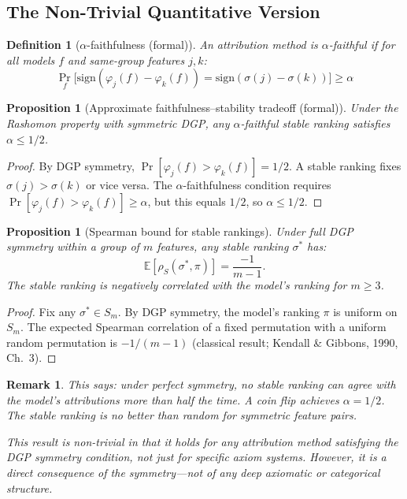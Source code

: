 \documentclass{article}
\newtheorem{definition}[theorem]{Definition}
\newtheorem{proposition}[theorem]{Proposition}
\newtheorem{remark}[theorem]{Remark}
\newcommand{\E}{\mathbb{E}}
\begin{document}
\subsection{The Non-Trivial Quantitative Version}

\begin{definition}[$\alpha$-faithfulness (formal)]
An attribution method is $\alpha$-faithful if for all models $f$ and same-group features $j, k$:
\[
    \Pr_f\!\big[\text{sign}(\varphi_j(f) - \varphi_k(f)) = \text{sign}(\sigma(j) - \sigma(k))\big] \geq \alpha
\]
\end{definition}

\begin{proposition}[Approximate faithfulness--stability tradeoff (formal)]
\label{prop:approx-tradeoff}
Under the Rashomon property with symmetric DGP, any $\alpha$-faithful stable ranking satisfies $\alpha \leq 1/2$.
\end{proposition}

\begin{proof}
By DGP symmetry, $\Pr[\varphi_j(f) > \varphi_k(f)] = 1/2$. A stable ranking fixes $\sigma(j) > \sigma(k)$ or vice versa. The $\alpha$-faithfulness condition requires $\Pr[\varphi_j(f) > \varphi_k(f)] \geq \alpha$, but this equals $1/2$, so $\alpha \leq 1/2$.
\end{proof}

\begin{proposition}[Spearman bound for stable rankings]
\label{prop:spearman-stable}
Under full DGP symmetry within a group of $m$ features, any stable ranking $\sigma^*$ has:
\[
    \E[\rho_S(\sigma^*, \pi)] = \frac{-1}{m - 1}.
\]
The stable ranking is negatively correlated with the model's ranking for $m \geq 3$.
\end{proposition}

\begin{proof}
Fix any $\sigma^* \in S_m$. By DGP symmetry, the model's ranking $\pi$ is uniform on $S_m$. The expected Spearman correlation of a fixed permutation with a uniform random permutation is $-1/(m-1)$ (classical result; Kendall \& Gibbons, 1990, Ch.~3).
\end{proof}

\begin{remark}
This says: under perfect symmetry, no stable ranking can agree
with the model's attributions more than half the time. A coin
flip achieves $\alpha = 1/2$. The stable ranking is no better
than random for symmetric feature pairs.

This result is non-trivial in that it holds for \emph{any}
attribution method satisfying the DGP symmetry condition, not
just for specific axiom systems. However, it is a direct
consequence of the symmetry---not of any deep axiomatic or
categorical structure.
\end{remark}
\end{document}
